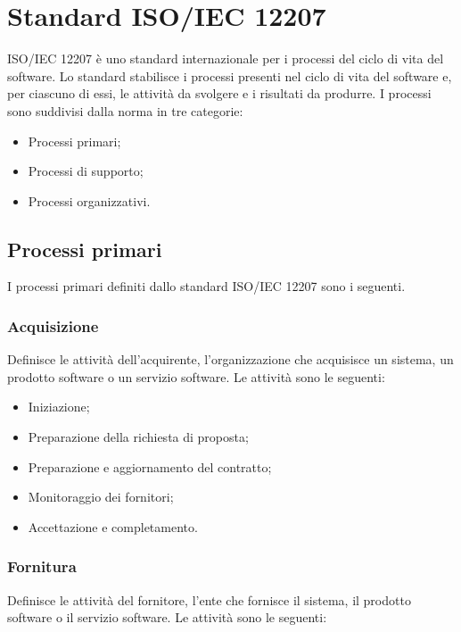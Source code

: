 \appendix
\section{Standard ISO/IEC 12207}
ISO/IEC 12207 è uno standard internazionale per i processi del ciclo di vita del software. Lo standard stabilisce i processi presenti nel ciclo di vita del software e, per ciascuno di essi, le attività da svolgere e i risultati da produrre.
I processi sono suddivisi dalla norma in tre categorie:

\begin{itemize}
	
	\item Processi primari;
	
	\item Processi di supporto;
	
	\item Processi organizzativi. 
\end{itemize}

\subsection{Processi primari}
I processi primari definiti dallo standard ISO/IEC 12207 sono i seguenti.

\subsubsection{Acquisizione}
Definisce le attività dell'acquirente, l'organizzazione che acquisisce un sistema, un prodotto software o un servizio software.
Le attività sono le seguenti:

\begin{itemize}

\item Iniziazione;

\item Preparazione della richiesta di proposta;
\item Preparazione e aggiornamento del contratto;
\item Monitoraggio dei fornitori;

\item Accettazione e completamento.

\end{itemize}

\subsubsection{Fornitura}
Definisce le attività del fornitore, l'ente che fornisce il sistema, il prodotto software o il servizio software.
Le attività sono le seguenti:

